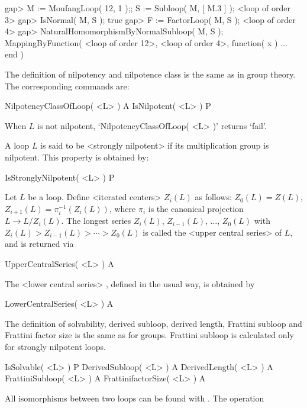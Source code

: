 \beginexample
gap> M := MoufangLoop( 12, 1 );; S := Subloop( M, [ M.3 ] );
<loop of order 3>
gap> IsNormal( M, S );
true
gap> F := FactorLoop( M, S );
<loop of order 4>
gap> NaturalHomomorphismByNormalSubloop( M, S );
MappingByFunction( <loop of order 12>, <loop of order 4>,
    function( x ) ... end )
\endexample


The definition of nilpotency and nilpotence class is the same as in group
theory. The corresponding commands are:

\>NilpotencyClassOfLoop( <L> ) A
\>IsNilpotent( <L> ) P

When $L$ is not nilpotent, `NilpotencyClassOfLoop( <L> )' returns `fail'.

A loop $L$ is said to be <strongly nilpotent> if its multiplication group is nilpotent. This property is obtained by:

\>IsStronglyNilpotent( <L> ) P

Let $L$ be a loop. Define <iterated centers>
%
%
 $Z_i(L)$ as
follows: $Z_0(L)=Z(L)$, $Z_{i+1}(L) = \pi_i^{-1}( Z_i(L) )$, where $\pi_i$ is
the canonical projection $L\to L/Z_i(L)$. The longest series $Z_i(L)$,
$Z_{i-1}(L)$, $\dots$, $Z_0(L)$ with $Z_i(L)>Z_{i-1}(L)>\cdots >Z_0(L)$ is
called the <upper central series>
%
%
 of $L$, and is returned via

\>UpperCentralSeries( <L> ) A

The <lower central series>
%
%
, defined in the usual way, is obtained by

\>LowerCentralSeries( <L> ) A


The definition of solvability, derived subloop, derived length, Frattini
subloop and Frattini factor size is the same as for groups. Frattini subloop is
calculated only for strongly nilpotent loops.

\>IsSolvable( <L> ) P
\>DerivedSubloop( <L> ) A
\>DerivedLength( <L> ) A
\>FrattiniSubloop( <L> ) A
\>FrattinifactorSize( <L> ) A


All isomorphisms between two loops can be found with {\LOOPS}. The operation

